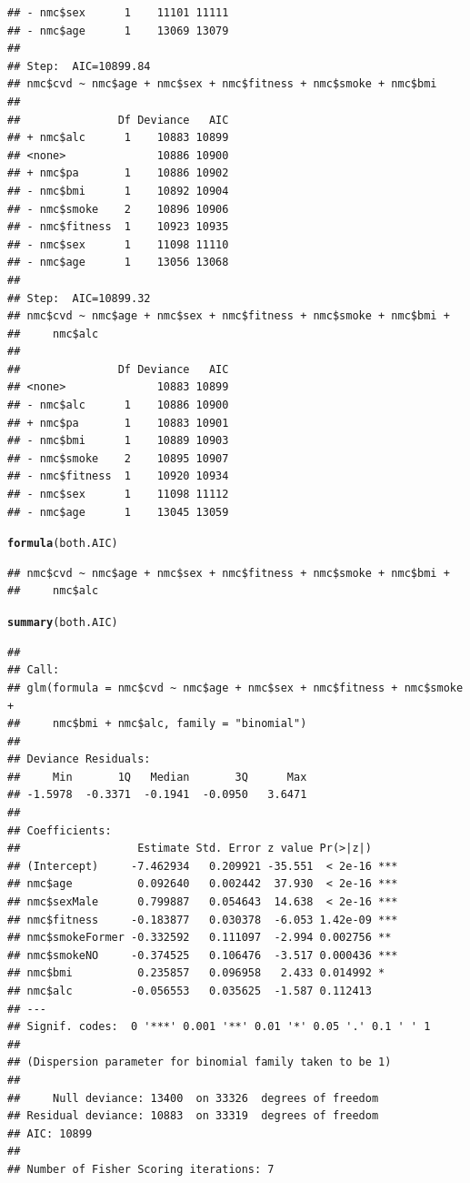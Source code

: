 \documentclass{article}\usepackage[]{graphicx}\usepackage[]{xcolor}
\makeatletter
\newcommand{\hlstd}[1]{\textcolor[rgb]{0.345,0.345,0.345}{#1}}%
\newcommand{\hlkwd}[1]{\textcolor[rgb]{0.737,0.353,0.396}{\textbf{#1}}}%
\newenvironment{kframe}{%
 \def\at@end@of@kframe{}%
 \ifinner\ifhmode%
  \def\at@end@of@kframe{\end{minipage}}%
  \begin{minipage}{\columnwidth}%
 \fi\fi%
 \def\FrameCommand##1{\hskip\@totalleftmargin \hskip-\fboxsep
 \colorbox{shadecolor}{##1}\hskip-\fboxsep
     \hskip-\linewidth \hskip-\@totalleftmargin \hskip\columnwidth}%
 \MakeFramed {\advance\hsize-\width
   \@totalleftmargin\z@ \linewidth\hsize
   \@setminipage}}%
 {\par\unskip\endMakeFramed%
 \at@end@of@kframe}
\newenvironment{knitrout}{}{} %
\makeatother
\begin{document}
\begin{knitrout}
\begin{kframe}
\begin{verbatim}
## - nmc$sex      1    11101 11111
## - nmc$age      1    13069 13079
## 
## Step:  AIC=10899.84
## nmc$cvd ~ nmc$age + nmc$sex + nmc$fitness + nmc$smoke + nmc$bmi
## 
##               Df Deviance   AIC
## + nmc$alc      1    10883 10899
## <none>              10886 10900
## + nmc$pa       1    10886 10902
## - nmc$bmi      1    10892 10904
## - nmc$smoke    2    10896 10906
## - nmc$fitness  1    10923 10935
## - nmc$sex      1    11098 11110
## - nmc$age      1    13056 13068
## 
## Step:  AIC=10899.32
## nmc$cvd ~ nmc$age + nmc$sex + nmc$fitness + nmc$smoke + nmc$bmi + 
##     nmc$alc
## 
##               Df Deviance   AIC
## <none>              10883 10899
## - nmc$alc      1    10886 10900
## + nmc$pa       1    10883 10901
## - nmc$bmi      1    10889 10903
## - nmc$smoke    2    10895 10907
## - nmc$fitness  1    10920 10934
## - nmc$sex      1    11098 11112
## - nmc$age      1    13045 13059
\end{verbatim}
\begin{alltt}
\hlkwd{formula}\hlstd{(both.AIC)}
\end{alltt}
\begin{verbatim}
## nmc$cvd ~ nmc$age + nmc$sex + nmc$fitness + nmc$smoke + nmc$bmi + 
##     nmc$alc
\end{verbatim}
\begin{alltt}
\hlkwd{summary}\hlstd{(both.AIC)}
\end{alltt}
\begin{verbatim}
## 
## Call:
## glm(formula = nmc$cvd ~ nmc$age + nmc$sex + nmc$fitness + nmc$smoke + 
##     nmc$bmi + nmc$alc, family = "binomial")
## 
## Deviance Residuals: 
##     Min       1Q   Median       3Q      Max  
## -1.5978  -0.3371  -0.1941  -0.0950   3.6471  
## 
## Coefficients:
##                  Estimate Std. Error z value Pr(>|z|)    
## (Intercept)     -7.462934   0.209921 -35.551  < 2e-16 ***
## nmc$age          0.092640   0.002442  37.930  < 2e-16 ***
## nmc$sexMale      0.799887   0.054643  14.638  < 2e-16 ***
## nmc$fitness     -0.183877   0.030378  -6.053 1.42e-09 ***
## nmc$smokeFormer -0.332592   0.111097  -2.994 0.002756 ** 
## nmc$smokeNO     -0.374525   0.106476  -3.517 0.000436 ***
## nmc$bmi          0.235857   0.096958   2.433 0.014992 *  
## nmc$alc         -0.056553   0.035625  -1.587 0.112413    
## ---
## Signif. codes:  0 '***' 0.001 '**' 0.01 '*' 0.05 '.' 0.1 ' ' 1
## 
## (Dispersion parameter for binomial family taken to be 1)
## 
##     Null deviance: 13400  on 33326  degrees of freedom
## Residual deviance: 10883  on 33319  degrees of freedom
## AIC: 10899
## 
## Number of Fisher Scoring iterations: 7
\end{verbatim}
\end{kframe}
\end{knitrout}
          
\end{document}
